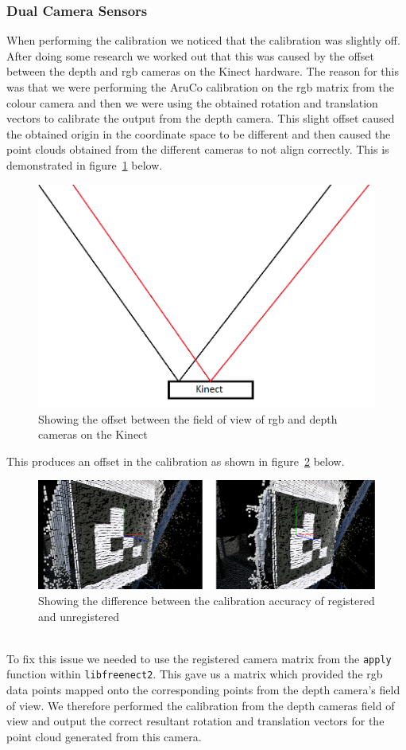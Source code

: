 \documentclass{article}
\begin{document}
\subsubsection{Dual Camera Sensors}
When performing the calibration we noticed that the calibration was slightly off. After doing some research we worked out that this was caused by the offset between the depth and rgb cameras on the Kinect hardware. The reason for this was that we were performing the AruCo calibration on the rgb matrix from the colour camera and then we were using the obtained rotation and translation vectors to calibrate the output from the depth camera. This slight offset caused the obtained origin in the coordinate space to be different and then caused the point clouds obtained from the different cameras to not align correctly. This is demonstrated in figure~\ref{fig:rgbdepth} below.
\begin{figure}[h]
  \centering
  \includegraphics[scale=0.4]{rgbdepth}
  \caption{Showing the offset between the field of view of rgb and depth cameras on the Kinect}
  \label{fig:rgbdepth}
\end{figure}
This produces an offset in the calibration as shown in figure~\ref{fig:calibrationoffset} below.
\\
\begin{figure}[h]
  \centering
  \includegraphics[scale=0.26]{registeredunregisteredpointcloud}
  \caption{Showing the difference between the calibration accuracy of registered and unregistered}
  \label{fig:calibrationoffset}
\end{figure}
\\
To fix this issue we needed to use the registered camera matrix from the \texttt{apply} function within \texttt{libfreenect2}. This gave us a matrix which provided the rgb data points mapped onto the corresponding points from the depth camera's field of view. We therefore performed the calibration from the depth cameras field of view and output the correct resultant rotation and translation vectors for the point cloud generated from this camera.
\end{document}
